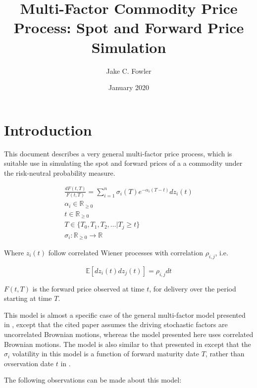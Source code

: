 \documentclass{article}
\title{Multi-Factor Commodity Price Process: Spot and Forward Price Simulation}
\author{Jake C. Fowler}
\date{January 2020}
\begin{document}
\newcommand{\+}[1]{\ensuremath{\mathbf{#1}}}

\maketitle

\section{Introduction}
This document describes a very general multi-factor price process, which is suitable
use in simulating the spot and forward prices of a a commodity under the risk-neutral
probability measure.

\bigskip

\begin{align}
    \label{eq:forward_sde}
    \frac{dF(t, T)}{F(t, T)}=\sum_{i=1}^n \sigma_i(T)e^{-\alpha_i(T-t)}dz_i(t) \\
    \nonumber
    \alpha_i \in \mathbb{R}_{\ge 0} \\
    \nonumber
    t \in \mathbb{R}_{\ge 0} \\
    \nonumber
    T \in \{ T_0, T_1, T_2, \hdots | T_j \ge t  \} \\
    \nonumber
    \sigma_i : \mathbb{R}_{\ge 0} \rightarrow \mathbb{R}
\end{align}


Where $z_i(t)$ follow correlated Wiener processes with correlation $\rho_{i, j}$, i.e.

\begin{equation}
    \mathbb{E}[dz_i(t)dz_j(t)] = \rho_{i, j}dt
\end{equation}

$F(t, T)$ is the forward price observed at time $t$, for delivery over the period
starting at time $T$.

\bigskip

This model is almost a specific case of the general multi-factor model presented
in \cite{Clewlow}, except that the cited paper assumes the driving stochastic factors
are uncorrelated Brownian motions, whereas the model presented here uses correlated
Brownian motions.
The model is also similar to that presented in \cite{Warin} except that the $\sigma_i$
volatility in this model is a function of forward maturity date $T$, rather than
ovservation date $t$ in \cite{Warin}.

\bigskip
The following observations can be made about this model:
\end{document}
